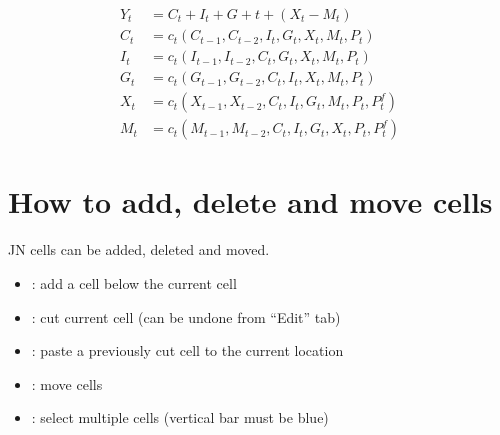 \documentclass[letterpaper,10pt,english]{jupyterBook}
\begin{document}
\begin{sphinxVerbatim}[commandchars=\\\{\}]
  
\PYGZbs{}
\end{sphinxVerbatim}
\begin{align*}
Y_t  &=  C_t+I_t+G+t+ (X_t-M_t) \\
C_t &= c_t(C_{t-1},C_{t-2},I_t,G_t,X_t,M_t,P_t)\\
I_t &= c_t(I_{t-1},I_{t-2},C_t,G_t,X_t,M_t,P_t)\\
G_t &= c_t(G_{t-1},G_{t-2},C_t,I_t,X_t,M_t,P_t)\\
X_t &= c_t(X_{t-1},X_{t-2},C_t,I_t,G_t,M_t,P_t,P^f_t)\\
M_t &= c_t(M_{t-1},M_{t-2},C_t,I_t,G_t,X_t,P_t,P^f_t)
\end{align*}

\section{How to add, delete and move cells}
\label{\detokenize{content/04_PythonEssentials/Intro_Jupyter_notebook:how-to-add-delete-and-move-cells}}
\sphinxAtStartPar
JN cells can be added, deleted and moved.

\sphinxAtStartPar
{}
\begin{itemize}
\item {} 
\sphinxAtStartPar
{}: add a cell below the current cell

\item {} 
\sphinxAtStartPar
{}: cut  current cell (can be undone from “Edit” tab)

\item {} 
\sphinxAtStartPar
{}: paste a previously cut cell to the current location

\item {} 
\sphinxAtStartPar
{}: move cells

\item {} 
\sphinxAtStartPar
{}: select multiple cells (vertical bar must be blue)

\end{itemize}
\end{document}
